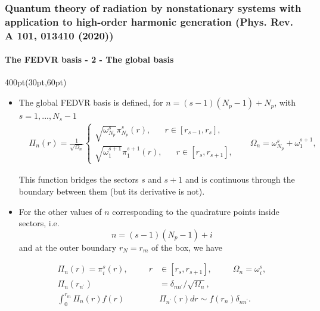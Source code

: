 \begin{frame}
\frametitle{Quantum theory of radiation by nonstationary systems 
	with application to high-order harmonic generation
        (Phys. Rev. A 101, 013410 (2020))}
	\framesubtitle{The FEDVR basis - 2 - The global basis}


\begin{textblock*}{400pt}(30pt,60pt)
\footnotesize
\begin{itemize}
\item The global FEDVR basis is defined, for $n = (s-1)(N_p-1)+N_p$,
with $s=1,...,N_s-1$
\begin{align}
& \Pi_n(r)  =  \frac{1}{\sqrt{\Omega_n}}
      \left\lbrace
      \begin{array}{l} 
       \sqrt{\omega_{N_p}^s}\pi_{N_p}^s(r),  
          \hspace{20pt} r \in \left[ r_{s-1}, r_s \right], \\
       \sqrt{\omega_{1}^{s+1}}\pi_{1}^{s+1}(r),  
          \hspace{20pt} r \in \left[ r_{s}, r_{s+1} \right],
      \end{array}\right.
       \hspace{20pt} \Omega_n = \omega_{N_p}^s + \omega_1^{s+1}, 
\label{eqn:global_dvr_basis}
\end{align}

This function bridges the sectors $s$ and $s+1$ and is continuous through the boundary between them (but its derivative is not). 

\item For the other values of $n$
corresponding to the quadrature points inside sectors, i.e.
\begin{equation}
n = (s-1)(N_p-1)+i
\end{equation}
and at the outer boundary $r_N = r_m$ of the box, we have

\begin{align}
       \Pi_n(r) = \pi_i^s(r), \hspace{10pt} 
         \hspace{20pt} r & \in \left[ r_{s}, r_{s+1} \right],
       \hspace{30pt} \Omega_n = \omega_i^s, \\
       \Pi_n(r_{n^\prime}) & = \delta_{nn^\prime} / \sqrt{\Omega_n}, \\
       \int_0^{r_m} \Pi_n(r) f(r) & \Pi_{n^\prime}(r) dr \sim f(r_n)\delta_{nn^\prime}.
\end{align}

\end{itemize}

\end{textblock*}



\end{frame}



